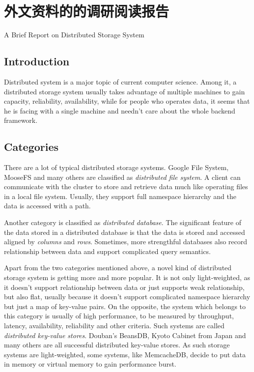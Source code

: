 \chapter{外文资料的的调研阅读报告}

\begin{center}
A Brief Report on Distributed Storage System
\end{center}

\section*{Introduction}
Distributed system is a major topic of current computer science. Among it, a
distributed storage system usually takes advantage of multiple machines to
gain capacity, reliability, availability, while for people who operates data,
it seems that he is facing with a single machine and needn't care about the
whole backend framework.

\section*{Categories}
There are a lot of typical distributed storage systems. Google File
System\cite{ghemawat2003google}, MooseFS\cite{moosefs} and many others are
classified as \emph{distributed file system}. A client can communicate with
the cluster to store and retrieve data much like operating files in a local
file system. Usually, they support full namespace hierarchy and the data is
accessed with a path.

Another category is classified as \emph{distributed database}. The significant
feature of the data stored in a distributed database is that the data is
stored and accessed aligned by \emph{columns} and \emph{rows}. Sometimes, more
strengthful databases also record relationship between data and support
complicated query semantics.

Apart from the two categories mentioned above, a novel kind of distributed
storage system is getting more and more popular. It is not only light-weighted,
as it doesn't support relationship between data or just supports weak
relationship, but also flat, usually because it doesn't support complicated
namespace hierarchy but just a map of key-value pairs. On the opposite, the
system which belongs to this category is usually of high performance, to be
measured by throughput, latency, availability, reliability and other criteria.
Such systems are called \emph{distributed key-value stores}. Douban's
BeansDB\cite{beansdb}, Kyoto Cabinet\cite{kyotocabinet} from Japan and many
others are all successful distributed key-value stores. As such storage
systems are light-weighted, some systems, like MemcacheDB\cite{memcachedb},
decide to put data in memory or virtual memory to gain performance burst.

